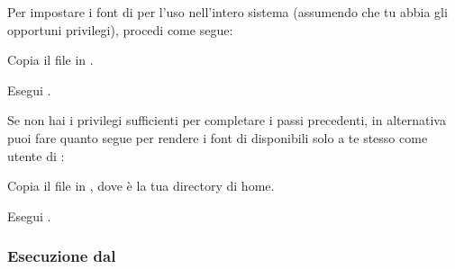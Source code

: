 \documentclass{article}
\begin{document}
Per impostare i font di \TL{} per l'uso nell'intero sistema (assumendo che
tu abbia gli opportuni privilegi), procedi come segue:
\begin{enumerate*}
\item Copia il file  in
.
\item Esegui .
\end{enumerate*}

Se non hai i privilegi sufficienti per completare i passi precedenti, in
alternativa puoi fare quanto segue per rendere i font di \TL{} disponibili
solo a te stesso come utente di \XeTeX{}:
\begin{enumerate*}
\item Copia il file  in
      , dove \filename{~} è la tua directory di
      home.
\item Esegui .
\end{enumerate*}


\subsubsection{Esecuzione dal \DVD}
\end{document}
